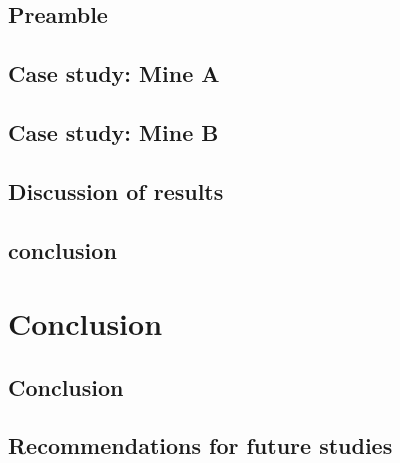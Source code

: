 \documentclass[12pt, english, oneside, singlespacing, open=any]{report}
\begin{document}
	\section{Preamble}
	\section{Case study: Mine A}
	\section{Case study: Mine B}
	\section{Discussion of results}
	\section{conclusion}

	
\chapter{Conclusion}
	 \section{Conclusion}
	 \section{Recommendations for future studies}
\end{document}
